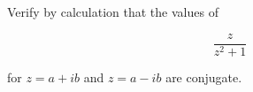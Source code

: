 Verify by calculation that the values of

$$\frac{z}{z^2+1}$$

for $z=a+ib$ and $z=a-ib$ are conjugate.\\

\begin{solution}\renewcommand{\qedsymbol}{}\ \\

    

\end{solution}